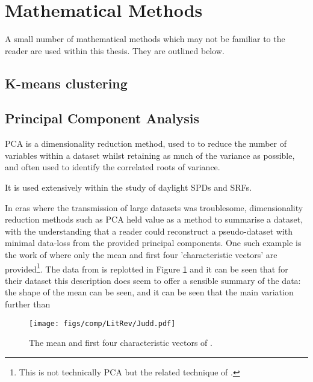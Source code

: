 \section{Mathematical Methods}

A small number of mathematical methods which may not be familiar to the reader are used within this thesis. They are outlined below.

\subsection{K-means clustering}

\subsection{Principal Component Analysis}

\gls{PCA} is a dimensionality reduction method, used to to reduce the number of variables within a dataset whilst retaining as much of the variance as possible, and often used to identify the correlated roots of variance.

It is used extensively within the study of daylight \glspl{SPD} and \glspl{SRF}. 

In eras where the transmission of large datasets was troublesome, dimensionality reduction methods such as \gls{PCA} held value as a method to summarise a dataset, with the understanding that a reader could reconstruct a pseudo-dataset with minimal data-loss from the provided principal components. One such example is the work of \citet{judd_spectral_1964} where only the mean and first four 'characteristic vectors' are provided\footnote{This is not technically \gls{PCA} but the related technique of \citet{morris_objective_1954}.}. The data from \citet{judd_spectral_1964} is replotted in Figure \ref{fig:Judd} and it can be seen that for their dataset this description does seem to offer a sensible summary of the data: the shape of the mean can be seen, and it can be seen that the main variation further than 

\begin{figure}[htbp]
 \texttt{[image: figs/comp/LitRev/Judd.pdf]}
 \caption{The mean and first four characteristic vectors of \citet{judd_spectral_1964}.}
 \label{fig:Judd}
\end{figure} 